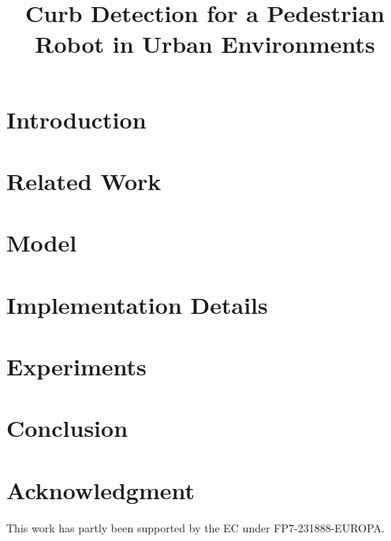 \documentclass[letterpaper, 10 pt, conference]{sty/ieeeconf}
\begin{document}
\title{\LARGE \bf
Curb Detection for a Pedestrian Robot in Urban Environments
}

\author{
}

\maketitle

\begin{abstract}

\end{abstract}

\section{Introduction}


\section{Related Work\label{sec:related}}


\section{Model\label{sec:model}}


%

\section{Implementation Details\label{sec:implementation}}


%

\section{Experiments\label{sec:exp}}


\section{Conclusion\label{sec:conc}}


\section*{Acknowledgment}
This work has partly been supported by the EC under FP7-231888-EUROPA.



\end{document}
